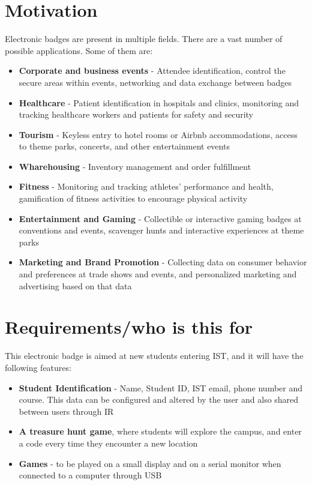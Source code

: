 \documentclass[portuguese]{ist-thesis}
\begin{document}
\section{Motivation}

Electronic badges are present in multiple fields. There are a vast number of possible applications. Some of them are:

\begin{itemize}
    \item \textbf{Corporate and business events} - Attendee identification, control the secure areas within events, networking and data exchange between badges 
    \item \textbf{Healthcare} - Patient identification in hospitals and clinics, monitoring and tracking healthcare workers and patients for safety and security
    \item \textbf{Tourism} - Keyless entry to hotel rooms or Airbnb accommodations, access to theme parks, concerts, and other entertainment events
    \item \textbf{Wharehousing} - Inventory management and order fulfillment
    \item \textbf{Fitness} - Monitoring and tracking athletes' performance and health, gamification of fitness activities to encourage physical activity
    \item \textbf{Entertainment and Gaming} - Collectible or interactive gaming badges at conventions and events, scavenger hunts and interactive experiences at theme parks
    \item \textbf{Marketing and Brand Promotion} - Collecting data on consumer behavior and preferences at trade shows and events, and personalized marketing and advertising based on that data
\end{itemize}

\section{Requirements/who is this for}

This electronic badge is aimed at new students entering IST, and it will have the following features:

\begin{itemize}
    \item \textbf{Student Identification} - Name, Student ID, IST email, phone number and course. This data can be configured and altered by the user and also shared between users through IR
    \item \textbf{A treasure hunt game}, where students will explore the campus, and enter a code every time they encounter a new location
    \item \textbf{Games} - to be played on a small display and on a serial monitor when connected to a computer through USB
\end{itemize}
\end{document}
